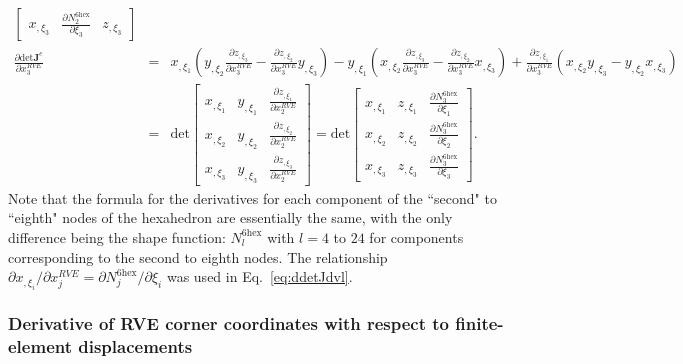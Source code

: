 \documentclass[12pt,aps,pre]{revtex4}
\begin{document}
\begin{eqnarray}
\begin{bmatrix}
x_{,\xi_3} & \frac{\partial N_2^{6\text{hex}}}{\partial \xi_3} &  z_{,\xi_3}
\end{bmatrix} \nonumber\\
\frac{\partial \text{det}\pmb{J}^e}{\partial x_3^{RVE}} &=& x_{,\xi_1}\left(y_{,\xi_2} \frac{\partial z_{,\xi_3}}{\partial x_3^{RVE}} - \frac{\partial z_{,\xi_2}}{\partial x_3^{RVE}} y_{,\xi_3} \right) - y_{,\xi_1}\left(x_{,\xi_2}\frac{\partial z_{,\xi_3}}{\partial x_3^{RVE}} - \frac{\partial z_{,\xi_2}}{\partial x_3^{RVE}} x_{,\xi_3} \right) + \frac{\partial z_{,\xi_1}}{\partial x_3^{RVE}}\left(x_{,\xi_2}y_{,\xi_3}-y_{,\xi_2}x_{,\xi_3} \right) \nonumber\\
%
&=& \text{det} \begin{bmatrix}
x_{,\xi_1} & y_{,\xi_1} & \frac{\partial z_{,\xi_1}}{\partial x_2^{RVE}}  \\
x_{,\xi_2} & y_{,\xi_2} & \frac{\partial z_{,\xi_2}}{\partial x_2^{RVE}}  \\
x_{,\xi_3} & y_{,\xi_3} & \frac{\partial z_{,\xi_3}}{\partial x_2^{RVE}} 
\end{bmatrix} 
%
= \text{det} \begin{bmatrix}
x_{,\xi_1} & z_{,\xi_1} & \frac{\partial N_3^{6\text{hex}}}{\partial \xi_1}  \\
x_{,\xi_2} & z_{,\xi_2} & \frac{\partial N_3^{6\text{hex}}}{\partial \xi_2}  \\
x_{,\xi_3} & z_{,\xi_3}& \frac{\partial N_3^{6\text{hex}}}{\partial \xi_3} 
\end{bmatrix} .
\label{eq:ddetJdvl}
\end{eqnarray}
%
Note that the formula for the derivatives for each component of the ``second" to ``eighth" nodes of the hexahedron are essentially the same, with the only difference being the shape function: $N_{l}^{6\text{hex}}$ with $l=4$ to $24$ for components corresponding to the second to eighth nodes. The relationship $\partial x_{,\xi_i}/\partial x_j^{RVE} = \partial N_j^{6\text{hex}}/\partial \xi_i$ was used in Eq.\ \eqref{eq:ddetJdvl}.

\subsubsection{Derivative of RVE corner coordinates with respect to finite-element displacements}
\end{document}

